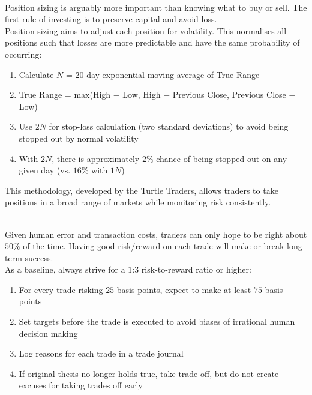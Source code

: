 \begin{remark} \\
Position sizing is arguably more important than knowing what to buy or sell. The first rule of investing is to preserve capital and avoid loss.\\
Position sizing aims to adjust each position for volatility. This normalises all positions such that losses are more predictable and have the same probability of occurring:
\begin{enumerate}[label=\roman*.]
\setlength{\itemsep}{0pt}
\item Calculate $N$ = $20$-day exponential moving average of True Range
\item True Range = max(High $-$ Low, High $-$ Previous Close, Previous Close $-$ Low)
\item Use $2N$ for stop-loss calculation (two standard deviations) to avoid being stopped out by normal volatility
\item With $2N$, there is approximately $2\%$ chance of being stopped out on any given day (vs. $16\%$ with $1N$)
\end{enumerate}
This methodology, developed by the Turtle Traders, allows traders to take positions in a broad range of markets while monitoring risk consistently.
\end{remark}

\begin{remark} \\
Given human error and transaction costs, traders can only hope to be right about $50\%$ of the time. Having good risk/reward on each trade will make or break long-term success.\\
As a baseline, always strive for a $1$:$3$ risk-to-reward ratio or higher:
\begin{enumerate}[label=\roman*.]
\setlength{\itemsep}{0pt}
\item For every trade risking $25$ basis points, expect to make at least $75$ basis points
\item Set targets before the trade is executed to avoid biases of irrational human decision making
\item Log reasons for each trade in a trade journal
\item If original thesis no longer holds true, take trade off, but do not create excuses for taking trades off early
\end{enumerate}
\end{remark}

